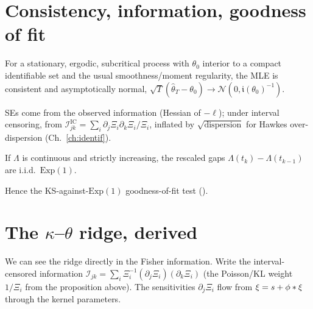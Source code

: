\section{Consistency, information, goodness of fit}

\begin{theorem}[Ogata]
For a stationary, ergodic, subcritical process with $\theta_0$ interior to a compact
identifiable set and the usual smoothness/moment regularity, the MLE is consistent
and asymptotically normal, $\sqrt T(\hat\theta_T-\theta_0)\to\mathcal N(0,\mathfrak i(\theta_0)^{-1})$.
\end{theorem}
SEs come from the observed information (Hessian of $-\ell$); under interval
censoring, from $\mathcal I^{\mathrm{IC}}_{jk}=\sum_i\partial_j\Xi_i\partial_k\Xi_i/\Xi_i$,
inflated by $\sqrt{\text{dispersion}}$ for Hawkes over-dispersion (Ch.~\ref{ch:identif}).

\begin{theorem}
If $\Lambda$ is continuous and strictly increasing, the rescaled gaps
$\Lambda(t_k)-\Lambda(t_{k-1})$ are i.i.d.\ $\mathrm{Exp}(1)$.
\end{theorem}
Hence the KS-against-$\mathrm{Exp}(1)$ goodness-of-fit test ().

\section{The $\kappa$--$\theta$ ridge, derived}

We can see the ridge directly in the Fisher information. Write the interval-censored
information $\mathcal I_{jk}=\sum_i \Xi_i^{-1}(\partial_j\Xi_i)(\partial_k\Xi_i)$
(the Poisson/KL weight $1/\Xi_i$ from the proposition above). The sensitivities
$\partial_j\Xi_i$ flow from $\xi=s+\phi\ast\xi$ through the kernel parameters.

